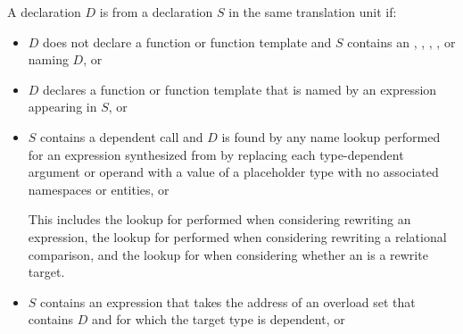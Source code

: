 \pnum
A declaration $D$ is  from a declaration $S$
in the same translation unit if:
\begin{itemize}
\item
$D$ does not declare a function or function template and
$S$ contains an
,
,
,
, or
naming $D$, or

\item
$D$ declares a function or function template that
is named by an expression
appearing in $S$, or

\item
$S$ contains a dependent call 
and $D$ is found by any name lookup performed
for an expression synthesized from 
by replacing each type-dependent argument or operand
with a value of a placeholder type
with no associated namespaces or entities, or
\begin{note}
This includes the lookup for  performed
when considering rewriting an \tcode{!=} expression,
the lookup for 
performed when considering rewriting a relational comparison, and
the lookup for 
when considering whether an  is a rewrite target.
\end{note}

\item
$S$ contains an expression that
takes the address of an overload set
that contains $D$ and
for which the target type is dependent, or


\end{itemize}
